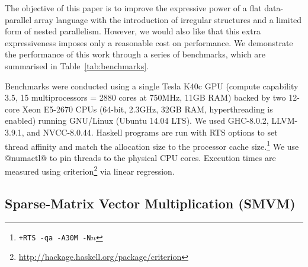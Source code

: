 The objective of this paper is to improve the expressive power of a flat
data-parallel array language with the introduction of irregular structures and a
limited form of nested parallelism. However, we would also like that this extra
expressiveness imposes only a reasonable cost on performance. We demonstrate the
performance of this work through a series of benchmarks, which are summarised in
Table~\ref{tab:benchmarks}.

Benchmarks were conducted using a single Tesla K40c GPU (compute capability 3.5,
15 multiprocessors = 2880 cores at 750MHz, 11GB RAM) backed by two 12-core Xeon
E5-2670 CPUs (64-bit, 2.3GHz, 32GB RAM, hyperthreading is enabled) running
GNU/Linux (Ubuntu 14.04 LTS). We used GHC-8.0.2, LLVM-3.9.1, and NVCC-8.0.44.
Haskell programs are run with RTS options to set thread affinity and match the
allocation size to the processor cache size.\footnote{\texttt{+RTS -qa -A30M
-N$n$}} We use @numactl@ to pin threads to the physical CPU cores.
Execution times are measured using
criterion\footnote{\url{http://hackage.haskell.org/package/criterion}} via
linear regression.%


\subsection{Sparse-Matrix Vector Multiplication (SMVM)}

